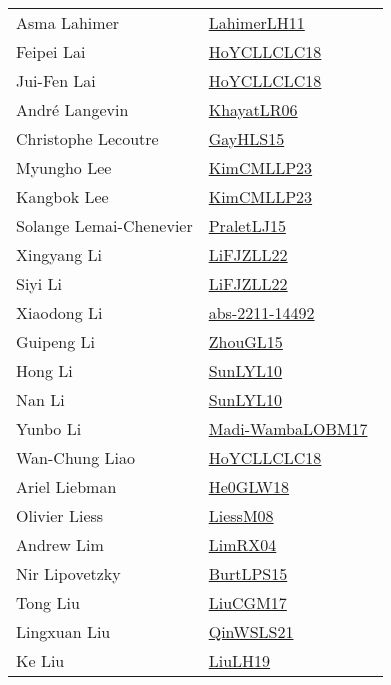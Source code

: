 {\begin{longtable}{p{4cm}p{20cm}}
Asma Lahimer & \href{works/LahimerLH11.pdf}{LahimerLH11}~\cite{LahimerLH11}\\
Feipei Lai & \href{works/HoYCLLCLC18.pdf}{HoYCLLCLC18}~\cite{HoYCLLCLC18}\\
Jui{-}Fen Lai & \href{works/HoYCLLCLC18.pdf}{HoYCLLCLC18}~\cite{HoYCLLCLC18}\\
Andr{\'{e}} Langevin & \href{works/KhayatLR06.pdf}{KhayatLR06}~\cite{KhayatLR06}\\
Christophe Lecoutre & \href{works/GayHLS15.pdf}{GayHLS15}~\cite{GayHLS15}\\
Myungho Lee & \href{works/KimCMLLP23.pdf}{KimCMLLP23}~\cite{KimCMLLP23}\\
Kangbok Lee & \href{works/KimCMLLP23.pdf}{KimCMLLP23}~\cite{KimCMLLP23}\\
Solange Lemai{-}Chenevier & \href{works/PraletLJ15.pdf}{PraletLJ15}~\cite{PraletLJ15}\\
Xingyang Li & \href{works/LiFJZLL22.pdf}{LiFJZLL22}~\cite{LiFJZLL22}\\
Siyi Li & \href{works/LiFJZLL22.pdf}{LiFJZLL22}~\cite{LiFJZLL22}\\
Xiaodong Li & \href{works/abs-2211-14492.pdf}{abs-2211-14492}~\cite{abs-2211-14492}\\
Guipeng Li & \href{works/ZhouGL15.pdf}{ZhouGL15}~\cite{ZhouGL15}\\
Hong Li & \href{works/SunLYL10.pdf}{SunLYL10}~\cite{SunLYL10}\\
Nan Li & \href{works/SunLYL10.pdf}{SunLYL10}~\cite{SunLYL10}\\
Yunbo Li & \href{works/Madi-WambaLOBM17.pdf}{Madi-WambaLOBM17}~\cite{Madi-WambaLOBM17}\\
Wan{-}Chung Liao & \href{works/HoYCLLCLC18.pdf}{HoYCLLCLC18}~\cite{HoYCLLCLC18}\\
Ariel Liebman & \href{works/He0GLW18.pdf}{He0GLW18}~\cite{He0GLW18}\\
Olivier Liess & \href{works/LiessM08.pdf}{LiessM08}~\cite{LiessM08}\\
Andrew Lim & \href{works/LimRX04.pdf}{LimRX04}~\cite{LimRX04}\\
Nir Lipovetzky & \href{works/BurtLPS15.pdf}{BurtLPS15}~\cite{BurtLPS15}\\
Tong Liu & \href{works/LiuCGM17.pdf}{LiuCGM17}~\cite{LiuCGM17}\\
Lingxuan Liu & \href{works/QinWSLS21.pdf}{QinWSLS21}~\cite{QinWSLS21}\\
Ke Liu & \href{works/LiuLH19.pdf}{LiuLH19}~\cite{LiuLH19}\\

\end{longtable}}
